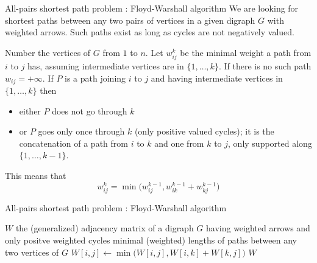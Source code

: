 \documentclass[32pt,aspectratio=169, handout]{beamer}
\begin{document}
\begin{frame}{All-pairs shortest path problem : Floyd-Warshall algorithm}
  We are looking for shortest paths between any two pairs of vertices
  in a given digraph $G$ with weighted arrows. \alert{Such paths exist
    as long as cycles are not negatively valued}.

  \vspace{.5\baselineskip}

  Number the vertices of $G$ from $1$ to $n$. Let $w_{ij}^k$
  be the minimal weight a path from $i$ to $j$ has, assuming
  intermediate vertices are in $\{1, \ldots, k\}$. If there is no such
  path $w_{ij} = +\infty$. If $P$ is a path joining $i$ to $j$ and having
  intermediate vertices in $\{1, \ldots, k \}$ then
  \begin{itemize}
  \item either $P$ does not go through $k$
  \item or $P$ goes only once through $k$ (only positive valued cycles);
    it is the concatenation of a path from $i$ to $k$ and one from $k$
    to $j$, only supported along $\{ 1, \ldots, k-1\}$.
  \end{itemize}
  This means that
  \begin{displaymath}
    w_{ij}^k = \min\Big( w_{ij}^{k-1}, w_{ik}^{k-1} + w_{kj}^{k-1} \Big)
  \end{displaymath}
\end{frame}

\begin{frame}{All-pairs shortest path problem : Floyd-Warshall algorithm}
    \small{
      \begin{algorithmic}[1]
       \Statex
       \Require $W$ the (generalized) adjacency matrix of a digraph $G$ having weighted arrows and only positve weighted cycles
       \Ensure minimal (weighted) lengths of paths between any two vertices of $G$
       \Statex
       \State $W[i,j] \gets \min\Big(W[i,j], W[i,k] + W[k,j]\Big)$
       \EndFor
       \EndFor
       \EndFor
       \State \Return $W$
     \end{algorithmic}
     }
\end{frame}
\end{document}
